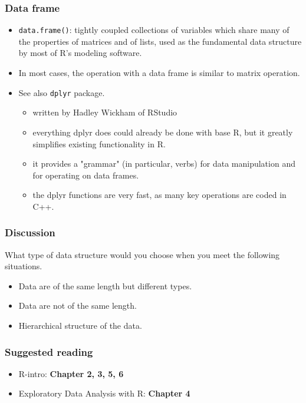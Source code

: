 \documentclass[10pt]{beamer}
\begin{document}
\begin{frame}
  \frametitle{Data frame}

  \begin{itemize}
  \item \texttt{data.frame()}: tightly coupled collections of
    variables which share many of the properties of matrices and of
    lists, used as the fundamental data structure by most of R's
    modeling software.

  \item In most cases, the operation with a data frame is similar to
    matrix operation.

  \item See also \texttt{dplyr} package.

    \begin{itemize}
    \item written by Hadley Wickham of RStudio
    \item everything dplyr does could already be done with base R, but it greatly simplifies existing functionality in R.
    \item it provides a "grammar" (in particular, verbs) for data manipulation and for operating on data frames.
    \item the dplyr functions are very fast, as many key operations are coded in C++.
    \end{itemize}

  \end{itemize}

\end{frame}

\begin{frame}
\frametitle{Discussion}

  What type of data structure would you choose when you meet the
    following situations.

    \begin{itemize}
    \item Data are of the same length but different types.
    \item Data are not of the same length.
    \item Hierarchical structure of the data.
    \end{itemize}

\end{frame}


\begin{frame}
  \frametitle{Suggested reading}

  \begin{itemize}
  \item R-intro: \textbf{Chapter 2, 3, 5, 6}
  \item Exploratory Data Analysis with R: \textbf{Chapter 4}
  \end{itemize}

\end{frame}
\end{document}

